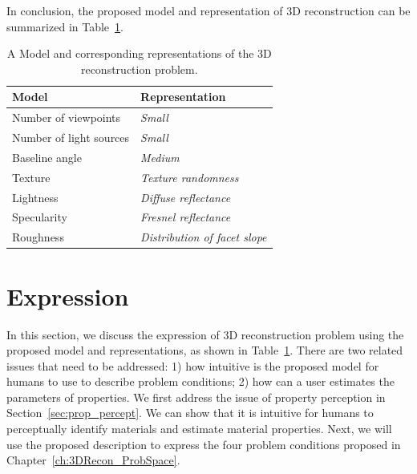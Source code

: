 In conclusion, the proposed model and representation of 3D reconstruction can be summarized in Table~\ref{tab:3DRecon_model_repre}.
\begin{table}[!htbp]
  \centering
  \begin{tabular}{l|l}
  \toprule
  \textbf{Model} & \textbf{Representation}\\
  \midrule
  Number of viewpoints & \textit{Small} \\
  Number of light sources & \textit{Small} \\
  Baseline angle & \textit{Medium} \\
  Texture & \textit{Texture randomness}\\
  Lightness & \textit{Diffuse reflectance}\\
  Specularity & \textit{Fresnel reflectance}\\
  Roughness & \textit{Distribution of facet slope}\\
  \bottomrule
  \end{tabular}
  \caption{A Model and corresponding representations of the 3D reconstruction problem.}
  \label{tab:3DRecon_model_repre}
\end{table}

\section{Expression}
\label{sec:3DRecon_Exp}
In this section, we discuss the expression of 3D reconstruction problem using the proposed model and representations, as shown in Table~\ref{tab:3DRecon_model_repre}. There are two related issues that need to be addressed: 1) how intuitive is the proposed model for humans to use to describe problem conditions; 2) how can a user estimates the parameters of properties. We first address the issue of property perception in Section~\ref{sec:prop_percept}. We can show that it is intuitive for humans to perceptually identify materials and estimate material properties. Next, we will use the proposed description to express the four problem conditions proposed in Chapter~\ref{ch:3DRecon_ProbSpace}.

